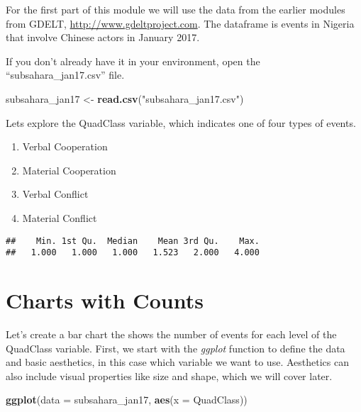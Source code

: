 \documentclass[]{book}
\newenvironment{Shaded}{\begin{snugshade}}{\end{snugshade}}
\newcommand{\KeywordTok}[1]{\textcolor[rgb]{0.13,0.29,0.53}{\textbf{{#1}}}}
\newcommand{\DataTypeTok}[1]{\textcolor[rgb]{0.13,0.29,0.53}{{#1}}}
\newcommand{\StringTok}[1]{\textcolor[rgb]{0.31,0.60,0.02}{{#1}}}
\newcommand{\NormalTok}[1]{{#1}}
\theoremstyle{definition}
\theoremstyle{definition}
\theoremstyle{remark}
\begin{document}
For the first part of this module we will use the data from the earlier
modules from GDELT, \url{http://www.gdeltproject.com}. The dataframe is
events in Nigeria that involve Chinese actors in January 2017.

If you don't already have it in your environment, open the
``subsahara\_jan17.csv'' file.

\begin{Shaded}
\begin{Highlighting}[]
\NormalTok{subsahara_jan17 <-}\StringTok{ }\KeywordTok{read.csv}\NormalTok{(}\StringTok{"subsahara_jan17.csv"}\NormalTok{)}
\end{Highlighting}
\end{Shaded}

Lets explore the QuadClass variable, which indicates one of four types
of events.

\begin{enumerate}
\def\labelenumi{\arabic{enumi}.}
\item
  Verbal Cooperation
\item
  Material Cooperation
\item
  Verbal Conflict
\item
  Material Conflict
\end{enumerate}

\begin{Shaded}
\end{Shaded}

\begin{verbatim}
##    Min. 1st Qu.  Median    Mean 3rd Qu.    Max. 
##   1.000   1.000   1.000   1.523   2.000   4.000
\end{verbatim}

\section{Charts with Counts}\label{charts-with-counts}

Let's create a bar chart the shows the number of events for each level
of the QuadClass variable. First, we start with the \emph{ggplot}
function to define the data and basic aesthetics, in this case which
variable we want to use. Aesthetics can also include visual properties
like size and shape, which we will cover later.

\begin{Shaded}
\begin{Highlighting}[]
\KeywordTok{ggplot}\NormalTok{(}\DataTypeTok{data =} \NormalTok{subsahara_jan17, }\KeywordTok{aes}\NormalTok{(}\DataTypeTok{x =} \NormalTok{QuadClass))}
\end{Highlighting}
\end{Shaded}
\end{document}
